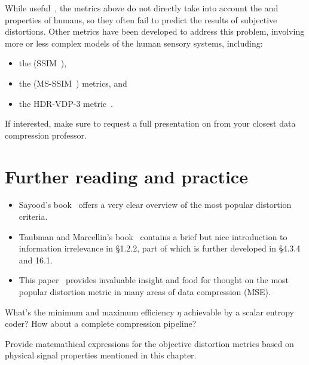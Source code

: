 While useful~\cite{mse_love}, the metrics above do not directly take into account the
 and  properties of humans, so they often
fail to predict the results of subjective distortions. Other metrics have been developed
to address this problem, involving more or less complex models of the human sensory systems, including:
\begin{itemize}
\item the  (SSIM~\cite{wang_ssim}),
\item the  (MS-SSIM~\cite{wang_ms_ssim}) metrics, and
\item the HDR-VDP-3 metric~\cite{mantiuk2023hdr}.
\end{itemize}

If interested, make sure to request a full presentation on 
from your closest data compression professor.


\section*{Further reading and practice}

\begin{itemize}
\item Sayood's book~\cite[\S 8.3]{sayood_introduction} offers a very clear overview of the most popular
distortion criteria.

\item Taubman and Marcellin's book~\cite{taubman2002jpeg2000} contains a brief but nice introduction to information irrelevance in \S 1.2.2,
part of which is further developed in \S 4.3.4 and 16.1.

\item This paper~\cite{mse_love} provides invaluable insight and food for thought
on the most popular distortion metric in many areas of data compression (MSE).
\end{itemize}

\begin{exercise}
What's the minimum and maximum efficiency $\eta$ achievable by a scalar entropy coder?
How about a complete compression pipeline?
\end{exercise}

\begin{exercise}
Provide matemathical expressions for the objective distortion metrics
based on physical signal properties mentioned in this chapter.
\end{exercise}


